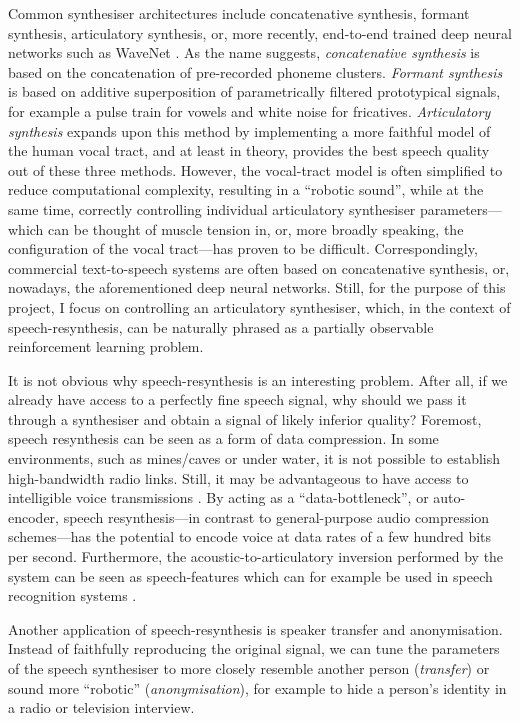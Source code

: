 \documentclass[letterpaper,10pt,conference]{ieeeconf}
\begin{document}
Common synthesiser architectures include concatenative synthesis, formant synthesis, articulatory synthesis, or, more recently, end-to-end trained deep neural networks such as WaveNet \cite{vandenoord2016wavenet}. As the name suggests, \emph{concatenative synthesis} is based on the concatenation of pre-recorded phoneme clusters. \emph{Formant synthesis} is based on additive superposition of parametrically filtered prototypical signals, for example a pulse train for vowels and white noise for fricatives. \emph{Articulatory synthesis} expands upon this method by implementing a more faithful model of the human vocal tract, and at least in theory, provides the best speech quality out of these three methods. However, the vocal-tract model is often simplified to reduce computational complexity, resulting in a \enquote{robotic sound}, while at the same time, correctly controlling individual articulatory synthesiser parameters---which can be thought of muscle tension in, or, more broadly speaking, the configuration of the vocal tract---has proven to be difficult. Correspondingly, commercial text-to-speech systems are often based on concatenative synthesis, or, nowadays, the aforementioned deep neural networks. Still, for the purpose of this project, I focus on controlling an articulatory synthesiser, which, in the context of speech-resynthesis, can be naturally phrased as a partially observable reinforcement learning problem.

It is not obvious why speech-resynthesis is an interesting problem. After all, if we already have access to a perfectly fine speech signal, why should we pass it through a synthesiser and obtain a signal of likely inferior quality? Foremost, speech resynthesis can be seen as a form of data compression. In some environments, such as mines/caves or under water, it is not possible to establish high-bandwidth radio links. Still, it may be advantageous to have access to intelligible voice transmissions \cite{barkand2006throughtheearth}. By acting as a \enquote{data-bottleneck}, or auto-encoder, speech resynthesis---in contrast to general-purpose audio compression schemes---has the potential to encode voice at data rates of a few hundred bits per second. Furthermore, the acoustic-to-articulatory inversion performed by the system can be seen as speech-features which can for example be used in speech recognition systems \cite{kirchhoff2002combining,prom-on2013training}.

Another application of speech-resynthesis is speaker transfer and anonymisation. Instead of faithfully reproducing the original signal, we can tune the parameters of the speech synthesiser to more closely resemble another person (\emph{transfer}) or sound more \enquote{robotic} (\emph{anonymisation}), for example to hide a person's identity in a radio or television interview.
\end{document}
